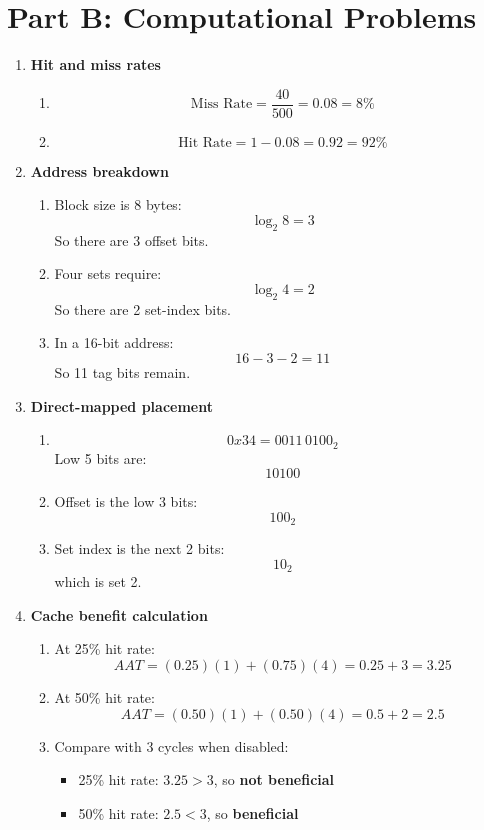 \documentclass[11pt]{article}
\begin{document}
\section*{Part B: Computational Problems}
\begin{enumerate}[label=\textbf{B\arabic*.}]
  \item \textbf{Hit and miss rates}
  \begin{enumerate}[label=(\alph*)]
    \item
    \[
      \text{Miss Rate} = \frac{40}{500} = 0.08 = 8\%
    \]
    \item
    \[
      \text{Hit Rate} = 1 - 0.08 = 0.92 = 92\%
    \]
  \end{enumerate}

  \item \textbf{Address breakdown}
  \begin{enumerate}[label=(\alph*)]
    \item Block size is 8 bytes:
    \[
      \log_2 8 = 3
    \]
    So there are 3 offset bits.
    \item Four sets require:
    \[
      \log_2 4 = 2
    \]
    So there are 2 set-index bits.
    \item In a 16-bit address:
    \[
      16 - 3 - 2 = 11
    \]
    So 11 tag bits remain.
  \end{enumerate}

  \item \textbf{Direct-mapped placement}
  \begin{enumerate}[label=(\alph*)]
    \item
    \[
      0x34 = 0011\,0100_2
    \]
    Low 5 bits are:
    \[
      10100
    \]
    \item Offset is the low 3 bits:
    \[
      100_2
    \]
    \item Set index is the next 2 bits:
    \[
      10_2
    \]
    which is set 2.
  \end{enumerate}

  \item \textbf{Cache benefit calculation}
  \begin{enumerate}[label=(\alph*)]
    \item At 25\% hit rate:
    \[
      AAT = (0.25)(1) + (0.75)(4) = 0.25 + 3 = 3.25
    \]
    \item At 50\% hit rate:
    \[
      AAT = (0.50)(1) + (0.50)(4) = 0.5 + 2 = 2.5
    \]
    \item Compare with 3 cycles when disabled:
    \begin{itemize}[leftmargin=1.5em]
      \item 25\% hit rate: \(3.25 > 3\), so \textbf{not beneficial}
      \item 50\% hit rate: \(2.5 < 3\), so \textbf{beneficial}
    \end{itemize}
  \end{enumerate}


\end{enumerate}
\end{document}
